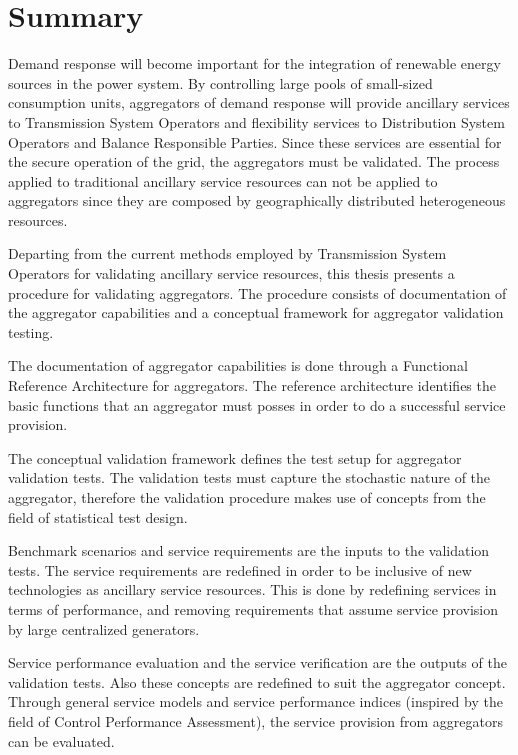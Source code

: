 \chapter{Summary}
Demand response will become important for the integration of renewable energy sources in the power system. By controlling large pools of small-sized consumption units, aggregators of demand response will provide ancillary services to Transmission System Operators and flexibility services to Distribution System Operators and Balance Responsible Parties. Since these services are essential for the secure operation of the grid, the aggregators must be validated. The process applied to traditional ancillary service resources can not be applied to aggregators since they are composed by geographically distributed heterogeneous resources.

Departing from the current methods employed by Transmission System Operators for validating ancillary service resources, this thesis presents a procedure for validating aggregators. The procedure consists of documentation of the aggregator capabilities and a conceptual framework for aggregator validation testing. 

The documentation of aggregator capabilities is done through a Functional Reference Architecture for aggregators. The reference architecture identifies the basic functions that an aggregator must posses in order to do a successful service provision. 

The conceptual validation framework defines the test setup for aggregator validation tests. The validation tests must capture the stochastic nature of the aggregator, therefore the validation procedure makes use of concepts from the field of statistical test design.

Benchmark scenarios and service requirements are the inputs to the validation tests. The service requirements are redefined in order to be inclusive of new technologies as ancillary service resources. This is done by redefining services in terms of performance, and removing requirements that assume service provision by large centralized generators.

Service performance evaluation and the service verification are the outputs of the validation tests. Also these concepts are redefined to suit the aggregator concept. Through general service models and service performance indices (inspired by the field of Control Performance Assessment), the service provision from aggregators can be evaluated.


